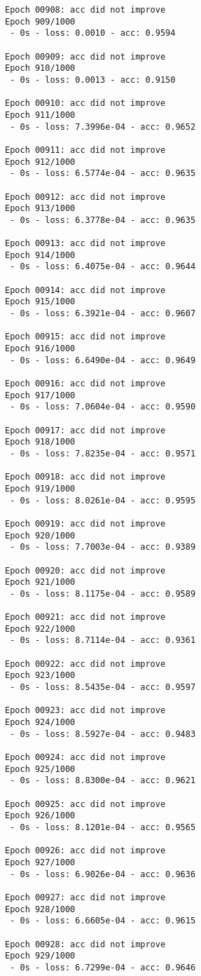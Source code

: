 \documentclass[11pt]{article}
\begin{document}
\begin{Verbatim}[commandchars=\\\{\}]
Epoch 00908: acc did not improve
Epoch 909/1000
 - 0s - loss: 0.0010 - acc: 0.9594

Epoch 00909: acc did not improve
Epoch 910/1000
 - 0s - loss: 0.0013 - acc: 0.9150

Epoch 00910: acc did not improve
Epoch 911/1000
 - 0s - loss: 7.3996e-04 - acc: 0.9652

Epoch 00911: acc did not improve
Epoch 912/1000
 - 0s - loss: 6.5774e-04 - acc: 0.9635

Epoch 00912: acc did not improve
Epoch 913/1000
 - 0s - loss: 6.3778e-04 - acc: 0.9635

Epoch 00913: acc did not improve
Epoch 914/1000
 - 0s - loss: 6.4075e-04 - acc: 0.9644

Epoch 00914: acc did not improve
Epoch 915/1000
 - 0s - loss: 6.3921e-04 - acc: 0.9607

Epoch 00915: acc did not improve
Epoch 916/1000
 - 0s - loss: 6.6490e-04 - acc: 0.9649

Epoch 00916: acc did not improve
Epoch 917/1000
 - 0s - loss: 7.0604e-04 - acc: 0.9590

Epoch 00917: acc did not improve
Epoch 918/1000
 - 0s - loss: 7.8235e-04 - acc: 0.9571

Epoch 00918: acc did not improve
Epoch 919/1000
 - 0s - loss: 8.0261e-04 - acc: 0.9595

Epoch 00919: acc did not improve
Epoch 920/1000
 - 0s - loss: 7.7003e-04 - acc: 0.9389

Epoch 00920: acc did not improve
Epoch 921/1000
 - 0s - loss: 8.1175e-04 - acc: 0.9589

Epoch 00921: acc did not improve
Epoch 922/1000
 - 0s - loss: 8.7114e-04 - acc: 0.9361

Epoch 00922: acc did not improve
Epoch 923/1000
 - 0s - loss: 8.5435e-04 - acc: 0.9597

Epoch 00923: acc did not improve
Epoch 924/1000
 - 0s - loss: 8.5927e-04 - acc: 0.9483

Epoch 00924: acc did not improve
Epoch 925/1000
 - 0s - loss: 8.8300e-04 - acc: 0.9621

Epoch 00925: acc did not improve
Epoch 926/1000
 - 0s - loss: 8.1201e-04 - acc: 0.9565

Epoch 00926: acc did not improve
Epoch 927/1000
 - 0s - loss: 6.9026e-04 - acc: 0.9636

Epoch 00927: acc did not improve
Epoch 928/1000
 - 0s - loss: 6.6605e-04 - acc: 0.9615

Epoch 00928: acc did not improve
Epoch 929/1000
 - 0s - loss: 6.7299e-04 - acc: 0.9646


\end{Verbatim}
\end{document}
